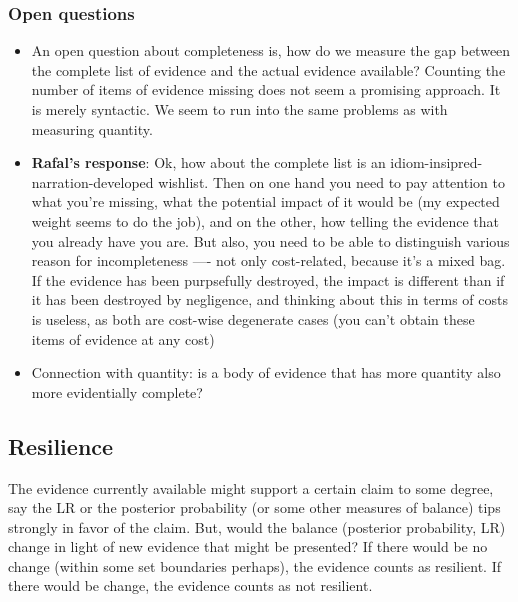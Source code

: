 \documentclass[
  10pt,
  dvipsnames,enabledeprecatedfontcommands]{scrartcl}
\begin{document}

\hypertarget{open-questions}{%
\subsubsection{Open questions}\label{open-questions}}

\begin{itemize}
\item
  An open question about completeness is, how do we measure the gap
  between the complete list of evidence and the actual evidence
  available? Counting the number of items of evidence missing does not
  seem a promising approach. It is merely syntactic. We seem to run into
  the same problems as with measuring quantity.
\item
  \textbf{Rafal's response}: Ok, how about the complete list is an
  idiom-insipred-narration-developed wishlist. Then on one hand you need
  to pay attention to what you're missing, what the potential impact of
  it would be (my expected weight seems to do the job), and on the
  other, how telling the evidence that you already have you are. But
  also, you need to be able to distinguish various reason for
  incompleteness ---- not only cost-related, because it's a mixed bag.
  If the evidence has been purpsefully destroyed, the impact is
  different than if it has been destroyed by negligence, and thinking
  about this in terms of costs is useless, as both are cost-wise
  degenerate cases (you can't obtain these items of evidence at any
  cost)
\item
  Connection with quantity: is a body of evidence that has more quantity
  also more evidentially complete?
\end{itemize}


\hypertarget{resilience}{%
\subsection{Resilience}\label{resilience}}


The evidence currently available might support a certain claim to some
degree, say the LR or the posterior probability (or some other measures
of balance) tips strongly in favor of the claim. But, would the balance
(posterior probability, LR) change in light of new evidence that might
be presented? If there would be no change (within some set boundaries
perhaps), the evidence counts as resilient. If there would be change,
the evidence counts as not resilient.
\end{document}

